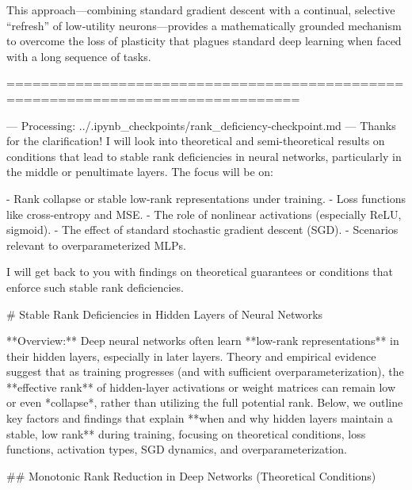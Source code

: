 This approach—combining standard gradient descent with a continual, selective “refresh” of low‐utility neurons—provides a mathematically grounded mechanism to overcome the loss of plasticity that plagues standard deep learning when faced with a long sequence of tasks.


================================================================================

--- Processing: ../.ipynb_checkpoints/rank_deficiency-checkpoint.md ---
Thanks for the clarification! I will look into theoretical and semi-theoretical results on conditions that lead to stable rank deficiencies in neural networks, particularly in the middle or penultimate layers. The focus will be on:

- Rank collapse or stable low-rank representations under training.
- Loss functions like cross-entropy and MSE.
- The role of nonlinear activations (especially ReLU, sigmoid).
- The effect of standard stochastic gradient descent (SGD).
- Scenarios relevant to overparameterized MLPs.

I will get back to you with findings on theoretical guarantees or conditions that enforce such stable rank deficiencies.

# Stable Rank Deficiencies in Hidden Layers of Neural Networks

**Overview:** Deep neural networks often learn **low-rank representations** in their hidden layers, especially in later layers. Theory and empirical evidence suggest that as training progresses (and with sufficient overparameterization), the **effective rank** of hidden-layer activations or weight matrices can remain low or even *collapse*, rather than utilizing the full potential rank. Below, we outline key factors and findings that explain **when and why hidden layers maintain a stable, low rank** during training, focusing on theoretical conditions, loss functions, activation types, SGD dynamics, and overparameterization. 

## Monotonic Rank Reduction in Deep Networks (Theoretical Conditions)

